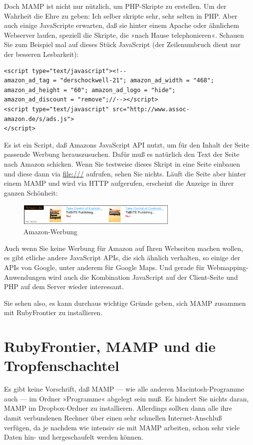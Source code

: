 \documentclass[11pt]{report}
\begin{document}
Doch MAMP ist nicht nur nützlich, um PHP-Skripte zu erstellen. Um der
Wahrheit die Ehre zu geben: Ich selber skripte sehr, sehr selten in
PHP. Aber auch einige JavaScripte erwarten, daß sie hinter einem
Apache oder ähnlichem Webserver laufen, speziell die Skripte, die
»nach Hause telephonieren«. Schauen Sie zum Beispiel mal auf dieses
Stück JavaScript (der Zeilenumbruch dient nur der besseren
Lesbarkeit):


\begin{verbatim}
<script type="text/javascript"><!-- 
amazon_ad_tag = "derschockwell-21"; amazon_ad_width = "468";
amazon_ad_height = "60"; amazon_ad_logo = "hide";
amazon_ad_discount = "remove";//--></script>
<script type="text/javascript" src="http://www.assoc-amazon.de/s/ads.js">
</script>
\end{verbatim}

Es ist ein Script, daß Amazons JavaScript API nutzt, um für den Inhalt
der Seite passende Werbung herauszusuchen. Dafür muß es natürlich den
Text der Seite nach Amazon schicken. Wenn Sie testweise dieses Skript
in eine Seite einbauen und diese dann via \href{file:///}{file:///} aufrufen, sehen Sie
nichts. Läuft die Seite aber hinter einem MAMP und wird via HTTP
aufgerufen, erscheint die Anzeige in ihrer ganzen Schönheit:

\begin{figure}[h!]
\centering
\includegraphics[width=0.7\textwidth]{./images/amazon.png}
\caption{\label{amazon}Amazon-Werbung}
\end{figure}

Auch wenn Sie keine Werbung für Amazon auf Ihren Webseiten machen
wollen, es gibt etliche andere JavaScript APIs, die sich ähnlich
verhalten, so einige der APIs von Google, unter anderem für Google
Maps. Und gerade für Webmapping-Anwendungen wird auch die Kombination
JavaScript auf der Client-Seite und PHP auf dem Server wieder
interessant.


Sie sehen also, es kann durchaus wichtige Gründe geben, sich MAMP
zusammen mit RubyFrontier zu installieren.
\section{RubyFrontier, MAMP und die Tropfenschachtel}
\label{sec-2-2-3}


Es gibt keine Vorschrift, daß MAMP — wie alle anderen
Macintosh-Programme auch — im Ordner »Programme« abgelegt sein muß. Es
hindert Sie nichts daran, MAMP im Dropbox-Ordner zu
installieren. Allerdings sollten dann alle ihre damit verbundenen
Rechner über einen sehr schnellen Internet-Anschluß verfügen, da je
nachdem wie intensiv sie mit MAMP arbeiten, schon sehr viele Daten
hin- und hergeschaufelt werden können.
\end{document}
